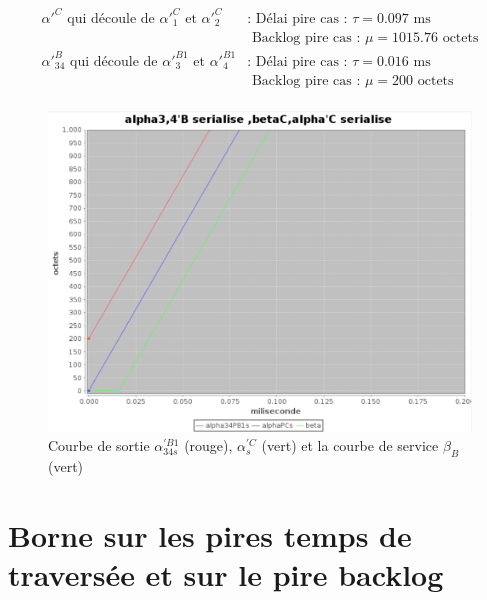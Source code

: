 \begin{align*}
\alpha'^C \text{ qui découle de } \alpha'^{C}_1 \text{ et } \alpha'^C_2
			& \text{: Délai pire cas   : }\tau = 	0.097 \text{ ms}\\
			& \text{  Backlog pire cas : }\mu = 1015.76\text{ octets}\\
\alpha'^B_{34} \text{ qui découle de } \alpha'^{B1}_3 \text{ et } \alpha'^{B1}_4
			& \text{: Délai pire cas   : }\tau = 	0.016 \text{ ms}\\
			& \text{  Backlog pire cas : }\mu = 200\text{ octets}\\
\end{align*}

\begin{figure}[!ht]
\centering%
\noindent\includegraphics[width = .5\textwidth]{./II/images/alpha_34s.png}%
\caption{\label{fig:alphaPB34}Courbe de sortie $\alpha_{34s}^{'B1}$ (rouge), $\alpha^{'C}_s$ (vert) et la courbe de service $\beta_B$ (vert)}
\end{figure}




\section{Borne sur les pires temps de traversée et sur le pire backlog}

